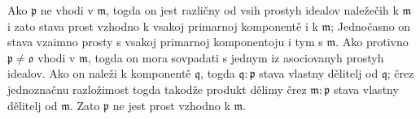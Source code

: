 \documentclass[11pt]{article}
\providecommand{\mm}{\mathfrak{m}}
\providecommand{\mo}{\mathfrak{o}}
\providecommand{\mq}{\mathfrak{q}}
\providecommand{\mpideal}{\mathfrak{p}}
\begin{document}
Ako $\mpideal$ ne vhodi v $\mm$, togda on jest različny od vsih prostyh idealov naležečih k $\mm$ i zato stava prost vzhodno k vsakoj primarnoj komponentě i k $\mm$; Jednočasno on stava vzaimno prosty s vsakoj primarnoj komponentoju i tym s $\mm$. Ako protivno $\mpideal\ne\mo$ vhodi v $\mm$, togda on mora sovpadati s jednym iz asociovanyh prostyh idealov. Ako on naleži k komponentě $\mq$, togda $\mq:\mpideal$ stava vlastny dělitelj od $\mq$; črez jednoznačnu razložimost togda takodže produkt dělimy črez $\mm:\mpideal$ stava vlastny dělitelj od $\mm$. Zato $\mpideal$ ne jest prost vzhodno k $\mm$.
\end{document}
